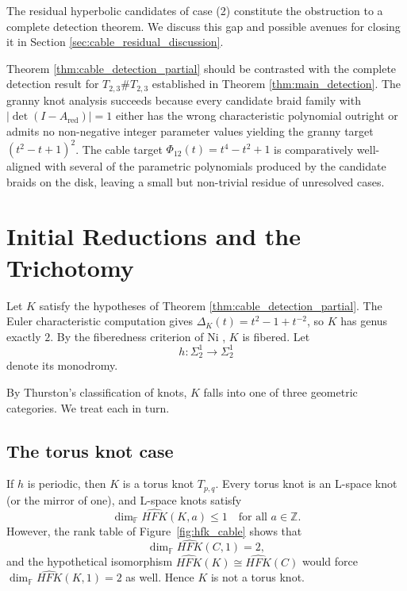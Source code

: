 The residual hyperbolic candidates of case (2) constitute the obstruction to a complete detection theorem. We discuss this gap and possible avenues for closing it in Section \ref{sec:cable_residual_discussion}.

\begin{remark}
Theorem \ref{thm:cable_detection_partial} should be contrasted with the complete detection result for $T_{2,3}\#T_{2,3}$ established in Theorem \ref{thm:main_detection}. The granny knot analysis succeeds because every candidate braid family with $|\det(I-A_{\text{red}})|=1$ either has the wrong characteristic polynomial outright or admits no non-negative integer parameter values yielding the granny target $(t^2-t+1)^2$. The cable target $\Phi_{12}(t) = t^4 - t^2 + 1$ is comparatively well-aligned with several of the parametric polynomials produced by the candidate braids on the disk, leaving a small but non-trivial residue of unresolved cases.
\end{remark}

\section{Initial Reductions and the Trichotomy}\label{sec:cable_trichotomy}

Let $K$ satisfy the hypotheses of Theorem \ref{thm:cable_detection_partial}. The Euler characteristic computation gives $\Delta_K(t) = t^2 - 1 + t^{-2}$, so $K$ has genus exactly $2$. By the fiberedness criterion of Ni \cite{Ni07}, $K$ is fibered. Let
\[
h \colon \Sigma_2^1 \to \Sigma_2^1
\]
denote its monodromy.

By Thurston's classification of knots, $K$ falls into one of three geometric categories. We treat each in turn.

\subsection{The torus knot case}\label{subsec:cable_torus}

If $h$ is periodic, then $K$ is a torus knot $T_{p,q}$. Every torus knot is an L-space knot (or the mirror of one), and L-space knots satisfy
\[
\dim_{\mathbb{F}} \widehat{HFK}(K, a) \le 1 \quad \text{for all } a \in \mathbb{Z}.
\]
However, the rank table of Figure~\ref{fig:hfk_cable} shows that
\[
\dim_{\mathbb{F}} \widehat{HFK}(C, 1) = 2,
\]
and the hypothetical isomorphism $\widehat{HFK}(K) \cong \widehat{HFK}(C)$ would force $\dim_{\mathbb{F}} \widehat{HFK}(K, 1) = 2$ as well. Hence $K$ is not a torus knot.

